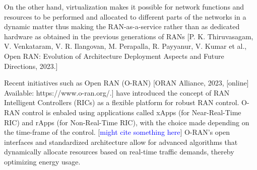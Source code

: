 
On the other hand, virtualization makes it possible for network functions and resources to be performed and allocated to different parts of the networks in a dynamic matter thus making the RAN-as-a-service rather than as dedicated hardware as obtained in the previous generations of RANs [P. K. Thiruvasagam, V. Venkataram, V. R. Ilangovan, M. Perapalla, R. Payyanur, V. Kumar et al., Open RAN: Evolution of Architecture Deployment Aspects and Future Directions, 2023.]

Recent initiatives such as Open RAN (O-RAN) [ORAN Alliance, 2023, [online] Available: https://www.o-ran.org/.] have introduced the concept of RAN Intelligent Controllers (RICs) as a flexible platform for robust RAN control.
O-RAN control is enbaled using applications called xApps (for Near-Real-Time RIC) and rApps (for Non-Real-Time RIC), with the choice made depending on the time-frame of the control. [\textcolor{blue}{might cite something here}]
O-RAN's open interfaces and standardized architecture allow for advanced algorithms that dynamically allocate resources based on real-time traffic demands, thereby optimizing energy usage.

